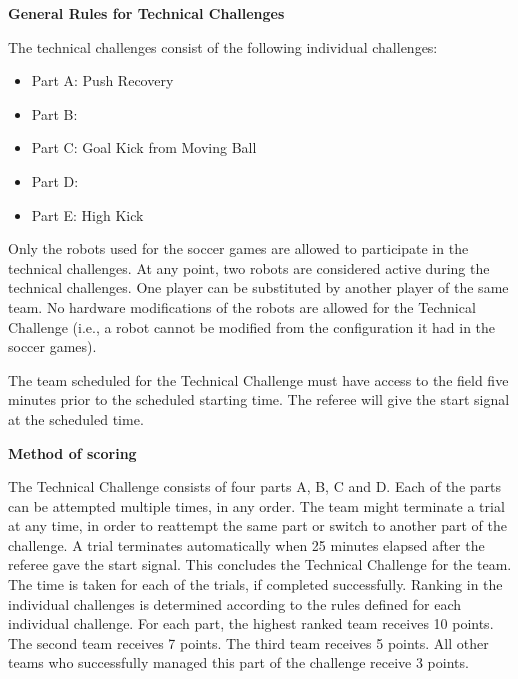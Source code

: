 \clearpage
\sffamily
{\bfseries\color[rgb]{0.4,0.4,0.4}
General Rules for Technical Challenges}
{}

\bigskip

The technical challenges consist of the following individual challenges:

\begin{itemize}
\item Part A: Push Recovery 
\item Part B: 
\item Part C: Goal Kick from Moving Ball
\item Part D:  
\item Part E: High Kick
\end{itemize}

\bigskip

Only the robots used for the soccer games are allowed to participate in the technical challenges.
At any point, two robots are considered active during the technical challenges.
One player can be substituted by another player of the same team.
No hardware modifications of the robots are allowed for the Technical Challenge
(i.e., a robot cannot be modified from the configuration it had in the soccer games). 

\bigskip

The team scheduled for the Technical Challenge must have access to the field five minutes prior to the scheduled starting time. The referee will give the start signal at the scheduled time.

\bigskip

{\bfseries Method of scoring}

\headlinebox
 
The Technical Challenge consists of four parts A, B, C and D. Each of the parts can be attempted multiple times, in any order. The team might terminate a trial at any time, in order to reattempt the same part or switch to another part of the challenge. A trial terminates automatically when 25 minutes elapsed after the referee gave the start
signal. This concludes the Technical Challenge for the team. The time is taken for each of the trials, if completed successfully. Ranking in the individual challenges is determined according to the rules defined
for each individual challenge. For each part, the highest ranked team receives 10 points. The second team receives 7 points. The third team receives 5 points. All other teams who successfully managed this part of the challenge receive 3 points.

